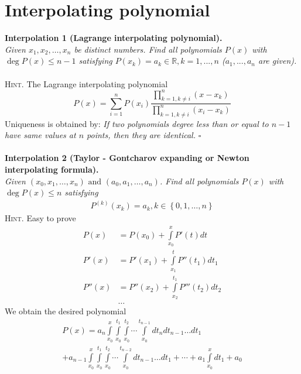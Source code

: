 \documentclass{article}
\numberwithin{equation}{section}
\begin{document}
\section{Interpolating polynomial}
\textbf{Interpolation 1 (Lagrange interpolating polynomial).}\\
\textit{Given ${x_1},{x_2}, \ldots ,{x_n}$ be distinct numbers. Find all polynomials $P(x)$ with $\deg P(x) \le n-1$ satisfying $P(x_k)=a_k \in \mathbb{R}, k=1,...,n$ ($a_1,...,a_n$ are given).}\\
\\
\textsc{Hint.} The Lagrange interpolating polynomial
\begin{equation}
P\left( x \right) = \sum\limits_{i = 1}^n {P\left( {{x_i}} \right)\frac{{\prod\limits_{k = 1,k \ne i}^n {\left( {x - {x_k}} \right)} }}{{\prod\limits_{k = 1,k \ne i}^n {\left( {{x_i} - {x_k}} \right)} }}}
\end{equation}
Uniqueness is obtained by: \textit{If two polynomials degree less than or equal to $n-1$ have same values at $n$ points, then they are identical.} \hfill $\square$\\
\\
\textbf{Interpolation 2 (Taylor - Gontcharov expanding or Newton interpolating formula).}\\
\textit{Given $\left( {{x_0},{x_1}, \ldots ,{x_n}} \right)\mbox{ and }\left( {{a_0},{a_1}, \ldots ,{a_n}} \right)$. Find all polynomials $P(x)$ with $\deg P(x) \le n$ satisfying}
\begin{align}
{P^{\left( k \right)}}\left( {{x_k}} \right) = {a_k},k \in \left\{ {0,1, \ldots ,n} \right\}
\end{align}
\textsc{Hint.}
Easy to prove
\begin{align}
P\left( x \right) &= P\left( {{x_0}} \right) + \int\limits_{{x_0}}^x {P'\left( t \right)} dt\\
P'\left( x \right) &= P'\left( {{x_1}} \right) + \int\limits_{{x_1}}^t {P''\left( {{t_1}} \right)} d{t_1}\\
P''\left( x \right) &= P''\left( {{x_2}} \right) + \int\limits_{{x_2}}^{{t_1}} {P'''\left( {{t_2}} \right)} d{t_2}\\
&\hdots
\end{align}
We obtain the desired polynomial
\begin{align}
P\left( x \right) = {a_n}\int\limits_{{x_0}}^x {\int\limits_{{x_0}}^{{t_1}} {\int\limits_{{x_0}}^{{t_2}} { \cdots \int\limits_{{x_0}}^{{t_{n - 1}}} {d{t_n}d{t_{n - 1}} \ldots d{t_1}} } } } \\
 + {a_{n - 1}}\int\limits_{{x_0}}^x {\int\limits_{{x_0}}^{{t_1}} {\int\limits_{{x_0}}^{{t_2}} { \cdots \int\limits_{{x_0}}^{{t_{n - 2}}} {d{t_{n - 1}} \ldots d{t_1}} }  +  \cdots  + {a_1}\int\limits_{{x_0}}^x {d{t_1}} }  + {a_0}} 
\end{align}
\end{document}
